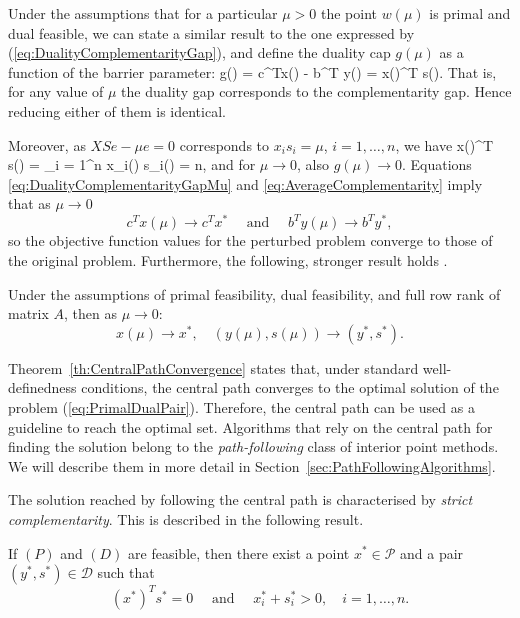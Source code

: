 
Under the assumptions that for a particular $\mu > 0$ the point
$w(\mu)$ is primal and dual feasible, we can state
a similar result to the one expressed by 
(\ref{eq:DualityComplementarityGap}), and define the duality cap
$g(\mu)$ as a function of the barrier parameter:
\be  \label{eq:DualityComplementarityGapMu}
  g(\mu) = c^Tx(\mu) - b^T y(\mu) = x(\mu)^T s(\mu).
\ee
That is, for any value of $\mu$
the duality gap corresponds to the complementarity gap.
Hence reducing either of them is identical.

Moreover, as $XSe - \mu e = 0$ corresponds to $x_is_i = \mu$, $i=1,\ldots,n$,
we have
\be  \label{eq:AverageComplementarity}
   x(\mu)^T s(\mu) = \sum_{i = 1}^n x_i(\mu) s_i(\mu) = n\mu,
\ee
and for $\mu \to 0$, also $g(\mu) \to 0$.
Equations \eqref{eq:DualityComplementarityGapMu} and
\eqref{eq:AverageComplementarity} imply that as $\mu\to 0$
\[
   c^Tx(\mu)\to c^Tx^* \quad \text{ and } \quad b^Ty(\mu) \to b^Ty^*,
\]
so the objective function values for the perturbed
problem converge to those of the original problem.
Furthermore, the following, stronger result holds \cite{Megiddo}.
%
\begin{theorem}
\label{th:CentralPathConvergence}
Under the assumptions of primal feasibility, dual feasibility, and
full row rank of matrix $A$, then as $\mu \to 0:$
\[
   x(\mu) \to x^*, \quad (y(\mu),s(\mu)) \to (y^*, s^*).
\]
\end{theorem}

Theorem~\ref{th:CentralPathConvergence} states that, under standard
well-definedness conditions, the central path converges to 
the optimal solution of the problem (\ref{eq:PrimalDualPair}).
Therefore, the central path can be used as a guideline to
reach the optimal set.
Algorithms that rely on the central path for finding the solution
belong to the {\em path-following} class of interior point methods.
We will describe them in more detail
in Section~\ref{sec:PathFollowingAlgorithms}.

The solution reached by following the central path is 
characterised by {\em strict complementarity}. 
This is described in the following result.

\begin{theorem}
If $(P)$ and $(D)$ are feasible, then there exist a point $x^* \in\mathcal{P}$
and a pair $(y^*,s^*) \in \mathcal{D}$ such that
\[
(x^*)^T s^* = 0 \quad\mbox{ and }\quad x^*_i + s_i^* >0, \quad i = 1,\ldots,n.
\]
\end{theorem}

